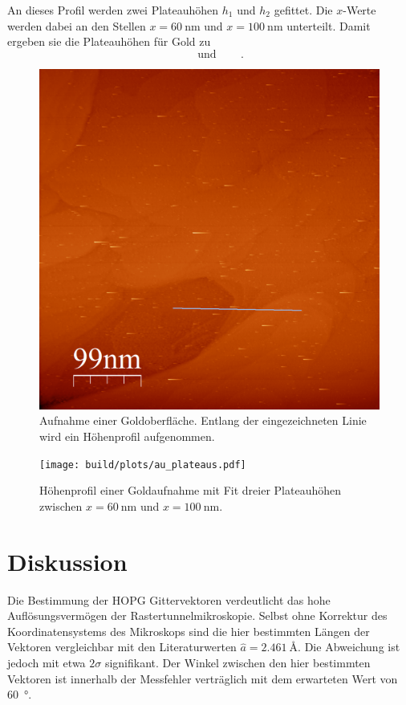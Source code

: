 An dieses Profil werden zwei Plateauhöhen $h_1$ und $h_2$ gefittet. Die
$x$-Werte werden dabei an den Stellen $x = \SI{60}{\nano\meter}$ und $x =
\SI{100}{\nano\meter}$ unterteilt.  Damit ergeben sie die Plateauhöhen für Gold
zu
\begin{equation*}
    \qquad\text{und}\qquad\,.
\end{equation*}
\begin{figure}
    \centering
    \includegraphics[width=0.9\linewidth]{raw/AU-1-View-2.png}
    \caption{
        Aufnahme einer Goldoberfläche. Entlang der eingezeichneten Linie
    wird ein Höhenprofil aufgenommen.
    }
    \label{fig:gold}
\end{figure}
\begin{figure}
    \centering
    \texttt{[image: build/plots/au\_plateaus.pdf]}
    \caption{
        Höhenprofil einer Goldaufnahme mit Fit dreier Plateauhöhen zwischen $x
        = \SI{60}{\nano\meter}$ und $x = \SI{100}{\nano\meter}$.
    }
    \label{fig:gold-fit}
\end{figure}

\section{Diskussion}
\label{sec:diskussion}
Die Bestimmung der HOPG Gittervektoren verdeutlicht das hohe
Auflösungsvermögen der Rastertunnelmikroskopie. Selbst ohne Korrektur des
Koordinatensystems des Mikroskops sind die hier bestimmten Längen der Vektoren
vergleichbar mit den Literaturwerten $\hat{a} = \SI{2.461}{\angstrom}$. Die
Abweichung ist jedoch mit etwa $2\sigma$ signifikant. Der Winkel zwischen den
hier bestimmten Vektoren ist innerhalb der
Messfehler verträglich mit dem erwarteten Wert von \SI{60}{\degree}.


